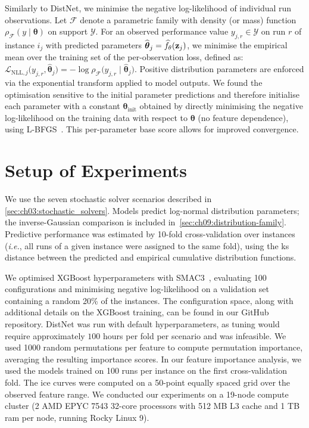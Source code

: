 Similarly to DistNet, we minimise the negative log-likelihood of individual run observations.
Let $\mathscr F$ denote a parametric family with density (or mass) function $\rho_{\mathscr F}(y\mid \boldsymbol\theta)$ on support $\mathcal{Y}$.
For an observed performance value $y_{j,r}\in\mathcal{Y}$ on run $r$ of instance $i_j$ with predicted parameters $\widehat{\boldsymbol\theta}_j=\widehat f_{\theta}(\mathbf{z}_j)$, we minimise the empirical mean over the training set of the per-observation loss, defined as:
$\mathcal L_{\mathrm{NLL},j}\bigl(y_{j,r},\widehat{\boldsymbol\theta}_j\bigr) = -\log \rho_{\mathscr F}\bigl(y_{j,r}\mid \widehat{\boldsymbol\theta}_j\bigr)$.
Positive distribution parameters are enforced via the exponential transform applied to model outputs.
We found the optimisation sensitive to the initial parameter predictions and therefore initialise each parameter with a constant $\boldsymbol\theta_{\mathrm{init}}$ obtained by directly minimising the negative log-likelihood on the training data with respect to $\boldsymbol\theta$ (no feature dependence), using L-BFGS~\citep{LiuNoc89}.
This per-parameter base score allows for improved convergence.

\section{Setup of Experiments}
\label{sec:ch09:exp}

We use the seven stochastic solver scenarios described in \cref{sec:ch03:stochastic_solvers}.
Models predict log-normal distribution parameters;
the inverse-Gaussian comparison is included in~\cref{sec:ch09:distribution-family}.
Predictive performance was estimated by 10-fold cross-validation over instances (\emph{i.e.}, all runs of a given instance were assigned to the same fold), using the \Gls{ks} distance between the predicted and empirical cumulative distribution functions.

We optimised XGBoost hyperparameters with SMAC3~\citep{LinEtAl22b}, evaluating 100 configurations and minimising negative log-likelihood on a validation set containing a random 20\% of the instances.
The configuration space, along with additional details on the XGBoost training, can be found in our GitHub repository.
DistNet was run with default hyperparameters, as tuning would require approximately $100$ hours per fold per scenario and was infeasible.
We used 1000 random permutations per feature to compute permutation importance, averaging the resulting importance scores.
In our feature importance analysis, we used the models trained on 100 runs per instance on the first cross-validation fold.
The \gls{ice} curves were computed on a 50-point equally spaced grid over the observed feature range.
We conducted our experiments on a 19-node compute cluster (2 AMD EPYC 7543 32-core processors with 512 MB L3 cache and 1 TB \gls{ram} per node, running Rocky Linux 9).

